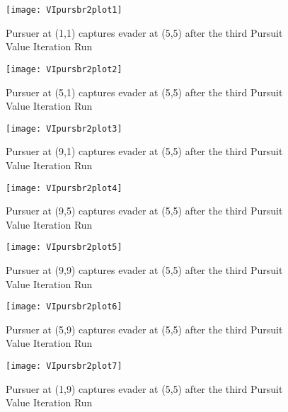 \begin{figure}
\vspace{2.4in}
\centering
\texttt{[image: VIpursbr2plot1]}
\caption{Pursuer at (1,1) captures evader at (5,5) after the third Pursuit Value Iteration Run}
\label{VIpursbr2plot1}
\end{figure}
\clearpage
\newpage

\begin{figure}
\vspace{2.4in}
\centering
\texttt{[image: VIpursbr2plot2]}
\caption{Pursuer at (5,1) captures evader at (5,5) after the third Pursuit Value Iteration Run}
\label{VIpursbr2plot2}
\end{figure}
\clearpage
\newpage

\begin{figure}
\vspace{2.4in}
\centering
\texttt{[image: VIpursbr2plot3]}
\caption{Pursuer at (9,1) captures evader at (5,5) after the third Pursuit Value Iteration Run}
\label{VIpursbr2plot3}
\end{figure}
\clearpage
\newpage

\begin{figure}
\vspace{2.4in}
\centering
\texttt{[image: VIpursbr2plot4]}
\caption{Pursuer at (9,5) captures evader at (5,5) after the third Pursuit Value Iteration Run}
\label{VIpursbr2plot4}
\end{figure}
\clearpage
\newpage

\begin{figure}
\vspace{2.4in}
\centering
\texttt{[image: VIpursbr2plot5]}
\caption{Pursuer at (9,9) captures evader at (5,5) after the third Pursuit Value Iteration Run}
\label{VIpursbr2plot5}
\end{figure}
\clearpage
\newpage

\begin{figure}
\vspace{2.4in}
\centering
\texttt{[image: VIpursbr2plot6]}
\caption{Pursuer at (5,9) captures evader at (5,5) after the third Pursuit Value Iteration Run}
\label{VIpursbr2plot6}
\end{figure}
\clearpage
\newpage

\begin{figure}
\vspace{2.4in}
\centering
\texttt{[image: VIpursbr2plot7]}
\caption{Pursuer at (1,9) captures evader at (5,5) after the third Pursuit Value Iteration Run}
\label{VIpursbr2plot7}
\end{figure}
\clearpage
\newpage

